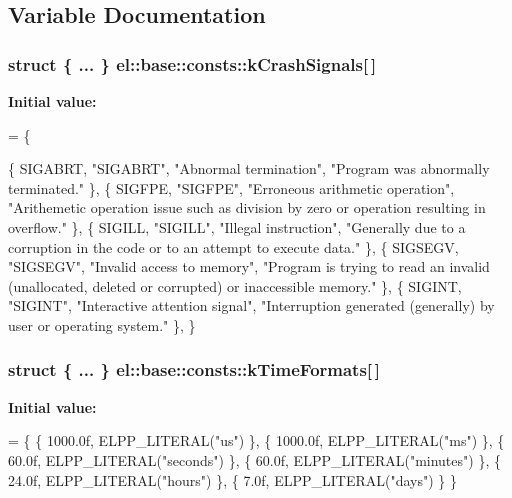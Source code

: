 \subsection{Variable Documentation}
\hypertarget{namespaceel_1_1base_1_1consts_ad7d7b54ac21d44433ab45f0f1e674a23}{
\subsubsection[{k\-Crash\-Signals}]{\setlength{\rightskip}{0pt plus 5cm}struct \{ ... \}   el\-::base\-::consts\-::k\-Crash\-Signals\mbox{[}$\,$\mbox{]}}}\label{namespaceel_1_1base_1_1consts_ad7d7b54ac21d44433ab45f0f1e674a23}
{\bfseries Initial value\-:}
\begin{DoxyCode}
= \{
  
  \{
    SIGABRT, \textcolor{stringliteral}{"SIGABRT"}, \textcolor{stringliteral}{"Abnormal termination"},
    \textcolor{stringliteral}{"Program was abnormally terminated."}
  \},
  \{
    SIGFPE, \textcolor{stringliteral}{"SIGFPE"}, \textcolor{stringliteral}{"Erroneous arithmetic operation"},
    \textcolor{stringliteral}{"Arithemetic operation issue such as division by zero or operation resulting in overflow."}
  \},
  \{
    SIGILL, \textcolor{stringliteral}{"SIGILL"}, \textcolor{stringliteral}{"Illegal instruction"},
    \textcolor{stringliteral}{"Generally due to a corruption in the code or to an attempt to execute data."}
  \},
  \{
    SIGSEGV, \textcolor{stringliteral}{"SIGSEGV"}, \textcolor{stringliteral}{"Invalid access to memory"},
    \textcolor{stringliteral}{"Program is trying to read an invalid (unallocated, deleted or corrupted) or inaccessible memory."}
  \},
  \{
    SIGINT, \textcolor{stringliteral}{"SIGINT"}, \textcolor{stringliteral}{"Interactive attention signal"},
    \textcolor{stringliteral}{"Interruption generated (generally) by user or operating system."}
  \},
\}
\end{DoxyCode}
\hypertarget{namespaceel_1_1base_1_1consts_a8d0a23a21b38b201d8e155c988e99d87}{
\subsubsection[{k\-Time\-Formats}]{\setlength{\rightskip}{0pt plus 5cm}struct \{ ... \}   el\-::base\-::consts\-::k\-Time\-Formats\mbox{[}$\,$\mbox{]}}}\label{namespaceel_1_1base_1_1consts_a8d0a23a21b38b201d8e155c988e99d87}
{\bfseries Initial value\-:}
\begin{DoxyCode}
= \{
  \{ 1000.0f, ELPP\_LITERAL(\textcolor{stringliteral}{"us"}) \},
  \{ 1000.0f, ELPP\_LITERAL(\textcolor{stringliteral}{"ms"}) \},
  \{ 60.0f, ELPP\_LITERAL(\textcolor{stringliteral}{"seconds"}) \},
  \{ 60.0f, ELPP\_LITERAL(\textcolor{stringliteral}{"minutes"}) \},
  \{ 24.0f, ELPP\_LITERAL(\textcolor{stringliteral}{"hours"}) \},
  \{ 7.0f, ELPP\_LITERAL(\textcolor{stringliteral}{"days"}) \}
\}
\end{DoxyCode}
